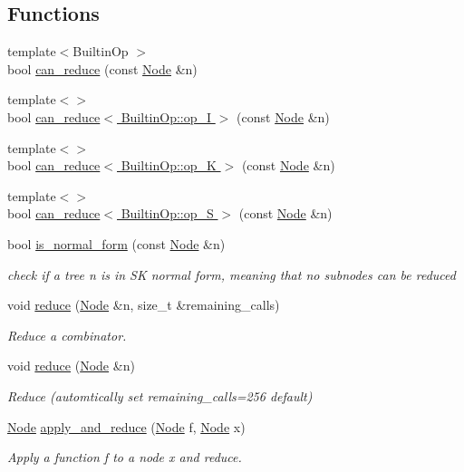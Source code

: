\subsection*{Functions}
\begin{DoxyCompactItemize}
\item 
{\footnotesize template$<$Builtin\+Op $>$ }\\bool \hyperlink{namespace_fleet_1_1_combinators_a3d456e1f1eeb0569b962e4ddb521c64a}{can\+\_\+reduce} (const \hyperlink{class_node}{Node} \&n)
\item 
{\footnotesize template$<$$>$ }\\bool \hyperlink{namespace_fleet_1_1_combinators_a8bef003899607e07e72709b799187195}{can\+\_\+reduce$<$ Builtin\+Op\+::op\+\_\+\+I $>$} (const \hyperlink{class_node}{Node} \&n)
\item 
{\footnotesize template$<$$>$ }\\bool \hyperlink{namespace_fleet_1_1_combinators_a0dd08c4539c98c52ea031ecf364bcb60}{can\+\_\+reduce$<$ Builtin\+Op\+::op\+\_\+\+K $>$} (const \hyperlink{class_node}{Node} \&n)
\item 
{\footnotesize template$<$$>$ }\\bool \hyperlink{namespace_fleet_1_1_combinators_a12bfc0d27b7b9672fc3a99a74be58523}{can\+\_\+reduce$<$ Builtin\+Op\+::op\+\_\+\+S $>$} (const \hyperlink{class_node}{Node} \&n)
\item 
bool \hyperlink{namespace_fleet_1_1_combinators_ae0176e1feedc8f2db63a7fedd927cdd9}{is\+\_\+normal\+\_\+form} (const \hyperlink{class_node}{Node} \&n)
\begin{DoxyCompactList}\small\item\em check if a tree n is in SK normal form, meaning that no subnodes can be reduced \end{DoxyCompactList}\item 
void \hyperlink{namespace_fleet_1_1_combinators_a39ef824add4fb94b4b2d0b967d14641a}{reduce} (\hyperlink{class_node}{Node} \&n, size\+\_\+t \&remaining\+\_\+calls)
\begin{DoxyCompactList}\small\item\em Reduce a combinator. \end{DoxyCompactList}\item 
void \hyperlink{namespace_fleet_1_1_combinators_ac1c41f1db65aa51fdeac1a4016b8212c}{reduce} (\hyperlink{class_node}{Node} \&n)
\begin{DoxyCompactList}\small\item\em Reduce (automtically set remaining\+\_\+calls=256 default) \end{DoxyCompactList}\item 
\hyperlink{class_node}{Node} \hyperlink{namespace_fleet_1_1_combinators_a8c5491d5248a57dfe08a4f730ab53fbd}{apply\+\_\+and\+\_\+reduce} (\hyperlink{class_node}{Node} f, \hyperlink{class_node}{Node} x)
\begin{DoxyCompactList}\small\item\em Apply a function f to a node x and reduce. \end{DoxyCompactList}\end{DoxyCompactItemize}
